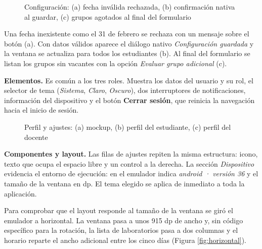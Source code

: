\begin{figure}[!htbp]
\centering
{}
\caption{Configuración: (a) fecha inválida rechazada, (b) confirmación nativa al guardar, (c) grupos agotados al final del formulario}
\label{fig:x11}
\end{figure}

Una fecha inexistente como el 31 de febrero se rechaza con un mensaje sobre el botón (a). Con datos válidos aparece el diálogo nativo \textit{Configuración guardada} y la ventana se actualiza para todos los estudiantes (b). Al final del formulario se listan los grupos sin vacantes con la opción \textit{Evaluar grupo adicional} (c).


\textbf{Elementos.} Es común a los tres roles. Muestra los datos del usuario y su rol, el selector de tema (\textit{Sistema}, \textit{Claro}, \textit{Oscuro}), dos interruptores de notificaciones, información del dispositivo y el botón \textbf{Cerrar sesión}, que reinicia la navegación hacia el inicio de sesión.

\begin{figure}[!htbp]
\centering
{}
\caption{Perfil y ajustes: (a) mockup, (b) perfil del estudiante, (c) perfil del docente}
\label{fig:i12}
\end{figure}

\textbf{Componentes y layout.} Las filas de ajustes repiten la misma estructura: icono, texto que ocupa el espacio libre y un control a la derecha. La sección \textit{Dispositivo} evidencia el entorno de ejecución: en el emulador indica \textit{android · versión 36} y el tamaño de la ventana en dp. El tema elegido se aplica de inmediato a toda la aplicación.

\vspace{0.2cm}

Para comprobar que el layout responde al tamaño de la ventana se giró el emulador a horizontal. La ventana pasa a unos 915 dp de ancho y, sin código específico para la rotación, la lista de laboratorios pasa a dos columnas y el horario reparte el ancho adicional entre los cinco días (Figura \ref{fig:horizontal}).

